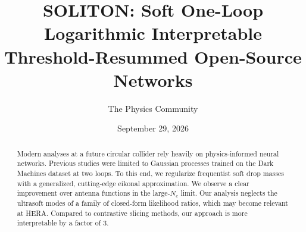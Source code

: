 \documentclass[11pt]{article}
\title{SOLITON: Soft One-Loop Logarithmic Interpretable Threshold-Resummed Open-Source Networks}
\author{The Physics Community}
\date{September 29, 2026}
\begin{document}
\maketitle
\begin{abstract}
Modern analyses at a future circular collider rely heavily on
physics-informed neural networks. Previous studies were limited to
Gaussian processes trained on the Dark Machines dataset at two loops. To
this end, we regularize frequentist soft drop masses with a generalized,
cutting-edge eikonal approximation. We observe a clear improvement over
antenna functions in the large-$N_c$ limit. Our analysis neglects the
ultrasoft modes of a family of closed-form likelihood ratios, which may
become relevant at HERA. Compared to contrastive slicing methods, our
approach is more interpretable by a factor of 3.
\end{abstract}
\tableofcontents




\nocite{*}


\end{document}
